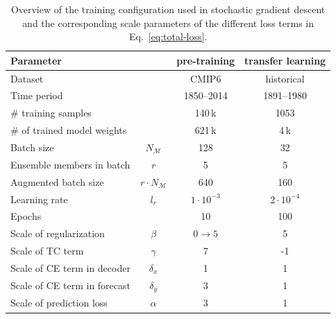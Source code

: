 \documentclass[english,a4paper,10pt]{scrartcl}
\begin{document}
\begin{table}
    \caption{\label{tab:model-training}Overview of the training configuration used in stochastic gradient descent and the corresponding scale parameters of the different loss terms in Eq.~\eqref{eq:total-loss}.}
    \centering{}
    \begin{tabular}{lccc}
        \toprule
        Parameter                    &                          & pre-training      & transfer learning \\
        \midrule
        Dataset                      &                          & CMIP6             & historical        \\
        Time period                  &                          & 1850--2014        & 1891--1980        \\
        \# training samples          &                          & 140\,k            & 1053              \\
        \# of trained model weights  &                          & 621\,k            & 4\,k              \\
        Batch size                   & $N_{\mathcal{M}}$        & 128               & 32                \\
        Ensemble members in batch    & $r$                      & 5                 & 5                 \\
        Augmented batch size         & $r\cdot N_{\mathcal{M}}$ & 640               & 160               \\
        Learning rate                & $l_r$                    & $1 \cdot 10^{-3}$ & $2 \cdot 10^{-4}$ \\
        Epochs                       &                          & 10                & 100               \\
        \midrule
        Scale of regularization      & $\beta$                  & $0\rightarrow5$   & 5                 \\
        Scale of TC term             & $\gamma$                 & 7                 & -1                \\
        Scale of CE term in decoder  & $\delta_{x}$             & 1                 & 1                 \\
        Scale of CE term in forecast & $\delta_{y}$             & 3                 & 1                 \\
        Scale of prediction loss     & $\alpha$                 & 3                 & 1                 \\
        \bottomrule
    \end{tabular}
\end{table}
\end{document}
